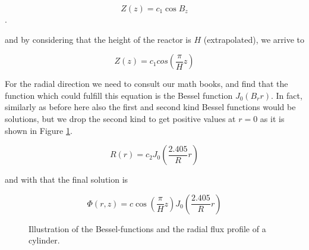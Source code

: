 \[
Z(z)=c_1\cos B_z
\].  

\noindent and by considering that the height of the reactor is $H$ (extrapolated), we arrive to

\[
Z(z)=c_1cos(\frac{\pi}{H}z)
\]

For the radial direction we need to consult our math books, and find that the function which could fulfill this equation is the Bessel function $J_0(B_rr)$. In fact, similarly as before here also the first and second kind Bessel functions would be solutions, but we drop the second kind to get positive values at $r=0$ as it is shown in Figure \ref{fig:cylinder}.

\[
R(r)=c_2J_0(\frac{2.405}{R}r)
\]

\noindent and with that the final solution is

\[
\Phi(r,z)=c\cos(\frac{\pi}{H}z)J_0(\frac{2.405}{R}r)
\]

\begin{figure}[ht!]
\protect {}\protect
\caption{\label{fig:cylinder} \footnotesize{Illustration of the Bessel-functions and the radial flux profile of a cylinder.}}
\end{figure} 

